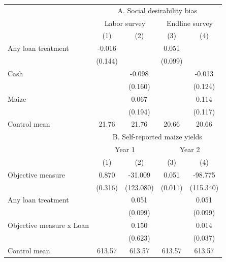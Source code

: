 \begin{tabular}{l cc cc}
\hline
 & \multicolumn{4}{c}{A. Social desirability bias} \\ 
 & \multicolumn{2}{c}{Labor survey} & \multicolumn{2}{c}{Endline survey} \\ 
 & (1) & (2) & (3) & (4) \\ 
\hline
Any loan treatment & -0.016 &  & 0.051 &  \\ 
 & (0.144) &  & (0.099) &  \\ 
Cash &  & -0.098 &  & -0.013 \\ 
  &  & (0.160) &  & (0.124) \\ 
Maize &  & 0.067 &  & 0.114 \\ 
  &  & (0.194) &  & (0.117) \\ 
Control mean & 21.76 & 21.76 & 20.66 & 20.66 \\ 
\hline
 & \multicolumn{4}{c}{B. Self-reported maize yields} \\ 
 & \multicolumn{2}{c}{Year 1} & \multicolumn{2}{c}{Year 2} \\ 
 & (1) & (2) & (3) & (4) \\ 
\hline
Objective measure & 0.870 & -31.009 & 0.051 & -98.775 \\ 
  & (0.316) & (123.080) & (0.011) & (115.340) \\ 
Any loan treatment &  & 0.051 &  & 0.051 \\ 
  &  & (0.099) &  & (0.099) \\ 
Objective measure x Loan &  & 0.150 &  & 0.014 \\ 
  &  & (0.623) &  & (0.037) \\ 
Control mean & 613.57 & 613.57 & 613.57 & 613.57 \\ 
 \hline 
\end{tabular} \\
